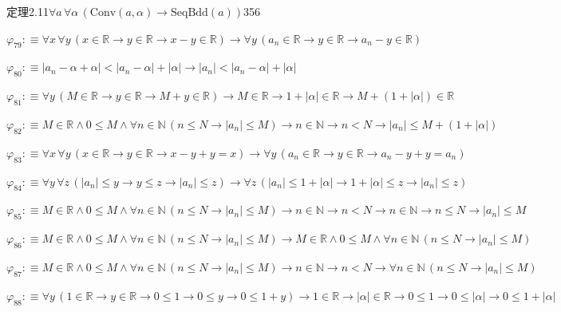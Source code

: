 \begin{fullproof}{定理2.11}{$\forall a\,\forall \alpha\,(\mathrm{Conv}(a,\alpha) \to \mathrm{SeqBdd}(a))$}{356}
\begin{abbrevlist}
\item $\varphi_{79} :\equiv \forall x\,\forall y\,(x \in \mathbb{R} \to y \in \mathbb{R} \to x - y \in \mathbb{R}) \to \forall y\,(a_{n} \in \mathbb{R} \to y \in \mathbb{R} \to a_{n} - y \in \mathbb{R})$
\item $\varphi_{80} :\equiv \lvert a_{n} - \alpha + \alpha \rvert < \lvert a_{n} - \alpha \rvert + \lvert \alpha \rvert \to \lvert a_{n} \rvert < \lvert a_{n} - \alpha \rvert + \lvert \alpha \rvert$
\item $\varphi_{81} :\equiv \forall y\,(M \in \mathbb{R} \to y \in \mathbb{R} \to M + y \in \mathbb{R}) \to M \in \mathbb{R} \to 1 + \lvert \alpha \rvert \in \mathbb{R} \to M + (1 + \lvert \alpha \rvert) \in \mathbb{R}$
\item $\varphi_{82} :\equiv M \in \mathbb{R} \land 0 \leq M \land \forall n \in \mathbb{N}\,(n \leq N \to \lvert a_{n} \rvert \leq M) \to n \in \mathbb{N} \to n < N \to \lvert a_{n} \rvert \leq M + (1 + \lvert \alpha \rvert)$
\item $\varphi_{83} :\equiv \forall x\,\forall y\,(x \in \mathbb{R} \to y \in \mathbb{R} \to x - y + y = x) \to \forall y\,(a_{n} \in \mathbb{R} \to y \in \mathbb{R} \to a_{n} - y + y = a_{n})$
\item $\varphi_{84} :\equiv \forall y\,\forall z\,(\lvert a_{n} \rvert \leq y \to y \leq z \to \lvert a_{n} \rvert \leq z) \to \forall z\,(\lvert a_{n} \rvert \leq 1 + \lvert \alpha \rvert \to 1 + \lvert \alpha \rvert \leq z \to \lvert a_{n} \rvert \leq z)$
\item $\varphi_{85} :\equiv M \in \mathbb{R} \land 0 \leq M \land \forall n \in \mathbb{N}\,(n \leq N \to \lvert a_{n} \rvert \leq M) \to n \in \mathbb{N} \to n < N \to n \in \mathbb{N} \to n \leq N \to \lvert a_{n} \rvert \leq M$
\item $\varphi_{86} :\equiv M \in \mathbb{R} \land 0 \leq M \land \forall n \in \mathbb{N}\,(n \leq N \to \lvert a_{n} \rvert \leq M) \to M \in \mathbb{R} \land 0 \leq M \land \forall n \in \mathbb{N}\,(n \leq N \to \lvert a_{n} \rvert \leq M)$
\item $\varphi_{87} :\equiv M \in \mathbb{R} \land 0 \leq M \land \forall n \in \mathbb{N}\,(n \leq N \to \lvert a_{n} \rvert \leq M) \to n \in \mathbb{N} \to n < N \to \forall n \in \mathbb{N}\,(n \leq N \to \lvert a_{n} \rvert \leq M)$
\item $\varphi_{88} :\equiv \forall y\,(1 \in \mathbb{R} \to y \in \mathbb{R} \to 0 \leq 1 \to 0 \leq y \to 0 \leq 1 + y) \to 1 \in \mathbb{R} \to \lvert \alpha \rvert \in \mathbb{R} \to 0 \leq 1 \to 0 \leq \lvert \alpha \rvert \to 0 \leq 1 + \lvert \alpha \rvert$

\end{abbrevlist}
\end{fullproof}
